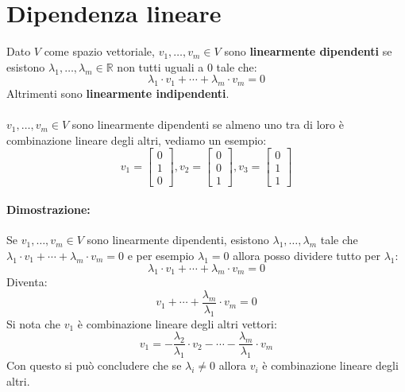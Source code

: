 \documentclass[12pt,a4paper]{article}
\let\oldsection\section
\renewcommand{\section}{\clearpage\oldsection}
\begin{document}
\section{Dipendenza lineare}
Dato $V$ come spazio vettoriale, $v_1,\ldots,v_m \in V$ sono \textbf{linearmente dipendenti} se esistono $\lambda_1,\ldots,\lambda_m \in \mathbb{R}$ non tutti uguali a $0$ tale che:
\[
\lambda_1 \cdot v_1 + \cdots + \lambda_m \cdot v_m = 0
\]
Altrimenti sono \textbf{linearmente indipendenti}.\\\\
$v_1,\ldots,v_m \in V$ sono linearmente dipendenti se almeno uno tra di loro è combinazione lineare degli altri, vediamo un esempio:
\[
v_1 = \begin{bmatrix}
  0\\
  1\\
  0
\end{bmatrix}, v_2 = \begin{bmatrix}
  0\\
  0\\
  1
\end{bmatrix}, v_3 = \begin{bmatrix}
  0\\
  1\\
  1
\end{bmatrix}
\]
\paragraph{Dimostrazione:}
Se $v_1,\ldots,v_m \in V$ sono linearmente dipendenti, esistono $\lambda_1,\ldots,\lambda_m$ tale che $\lambda_1 \cdot v_1 + \cdots + \lambda_m \cdot v_m = 0$ e per esempio $\lambda_1 = 0$ allora posso dividere tutto per $\lambda_1$:
\[
\lambda_1 \cdot v_1 + \cdots + \lambda_m \cdot v_m = 0
\]
Diventa:
\[
v_1 + \cdots + \frac{\lambda_m}{\lambda_1} \cdot v_m = 0
\]
Si nota che $v_1$ è combinazione lineare degli altri vettori:
\[
v_1 = -\frac{\lambda_2}{\lambda_1} \cdot v_2 - \cdots - \frac{\lambda_m}{\lambda_1} \cdot v_m
\]
Con questo si può concludere che se $\lambda_i \ne 0$ allora $v_i$ è combinazione lineare degli altri.
\end{document}
